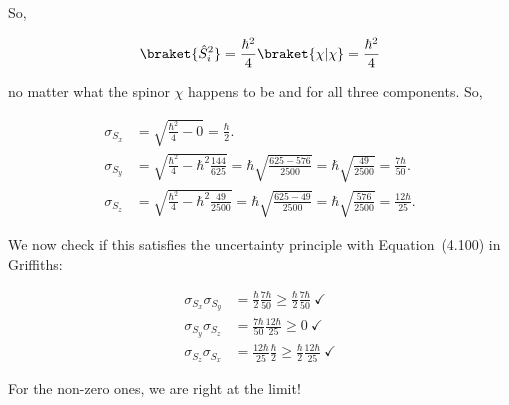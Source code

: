 \begin{parts}
So,

\begin{equation}
    \braket{\hat{S}_i^2} = \frac{\hbar^2}{4}\braket{\chi | \chi} = \frac{\hbar^2}{4}
\end{equation}

no matter what the spinor $\chi$ happens to be and for all three components. So,

\begin{align}
    \sigma_{S_x} &= \sqrt{\frac{\hbar^2}{4} - 0} = \boxed{\frac{\hbar}{2}.} \\
    \sigma_{S_y} &= \sqrt{\frac{\hbar^2}{4} - \hbar^2 \frac{144}{625}} = \hbar \sqrt{\frac{625-576}{2500}} = \hbar\sqrt{\frac{49}{2500}} = \boxed{\frac{7\hbar}{50}.} \\
    \sigma_{S_z} &= \sqrt{\frac{\hbar^2}{4} - \hbar^2\frac{49}{2500}} = \hbar\sqrt{\frac{625 - 49}{2500}} = \hbar\sqrt{\frac{576}{2500}} = \boxed{\frac{12\hbar}{25}.}
\end{align}


\item We now check if this satisfies the uncertainty principle with Equation~(4.100) in Griffiths:

\begin{align}
    \sigma_{S_x}\sigma_{S_y} &= \frac{\hbar}{2}\frac{7\hbar}{50} \geq \frac{\hbar}{2}\frac{7\hbar}{50} \ \checkmark \\
    \sigma_{S_y}\sigma_{S_z} &= \frac{7\hbar}{50}\frac{12\hbar}{25} \geq 0 \ \checkmark \\
    \sigma_{S_z}\sigma_{S_x} &= \frac{12\hbar}{25}\frac{\hbar}{2} \geq \frac{\hbar}{2}\frac{12\hbar}{25} \ \checkmark
\end{align}

For the non-zero ones, we are right at the limit!



\end{parts}
